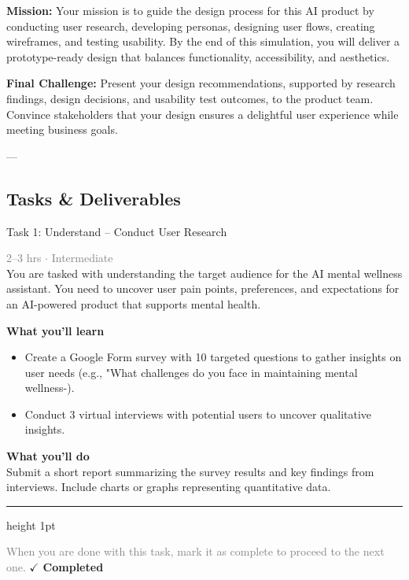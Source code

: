 \documentclass[10pt,a4paper]{article}
\begin{document}
\textbf{Mission:}  
Your mission is to guide the design process for this AI product by conducting user research, developing personas, designing user flows, creating wireframes, and testing usability. By the end of this simulation, you will deliver a prototype-ready design that balances functionality, accessibility, and aesthetics.

\textbf{Final Challenge:}  
Present your design recommendations, supported by research findings, design decisions, and usability test outcomes, to the product team. Convince stakeholders that your design ensures a delightful user experience while meeting business goals.

---

\subsection*{Tasks \& Deliverables}

\begin{taskbox}{Task 1: Understand – Conduct User Research}

    {\small \textcolor{gray}{2--3 hrs $\cdot$ Intermediate}}\\[12pt]

      
You are tasked with understanding the target audience for the AI mental wellness assistant. You need to uncover user pain points, preferences, and expectations for an AI-powered product that supports mental health.


\vspace{8pt}
{\large \textbf{\textcolor{brandLight}{What you'll learn}}}\\[4pt]  
\begin{itemize}
    \item Create a Google Form survey with 10 targeted questions to gather insights on user needs (e.g., "What challenges do you face in maintaining mental wellness-).  
    \item Conduct 3 virtual interviews with potential users to uncover qualitative insights.
\end{itemize}

\vspace{8pt}
{\large \textbf{\textcolor{brandLight}{What you'll do}}}\\[4pt]  
Submit a short report summarizing the survey results and key findings from interviews. Include charts or graphs representing quantitative data.\par

    \vspace{16pt}

    \textcolor{cardBorder}{\hrule height 1pt}\vspace{8pt}

    \small \textcolor{gray}{When you are done with this task, mark it as complete to proceed to the next one.} \hfill \textbf{\textcolor{brandDark}{$\checkmark$ Completed}}

\end{taskbox}
\end{document}
